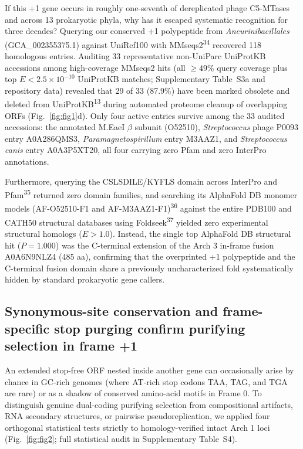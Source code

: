 \documentclass[10pt,letterpaper]{article}
\newcommand{\spname}[1]{\textit{#1}}
\newcommand{\refsup}[1]{\textsuperscript{#1}}
\begin{document}
If this +1 gene occurs in roughly one-seventh of dereplicated phage C5-MTases and across 13 prokaryotic phyla, why has it escaped systematic recognition for three decades? Querying our conserved +1 polypeptide from \spname{Aneurinibacillales} (GCA\_002355375.1) against UniRef100 with MMseqs2\refsup{34} recovered 118 homologous entries. Auditing 33 representative non-UniParc UniProtKB accessions among high-coverage MMseqs2 hits (all $\ge 49\%$ query coverage plus top $E < 2.5 \times 10^{-10}$ UniProtKB matches; Supplementary Table~S3a and repository data) revealed that 29 of 33 (87.9\%) have been marked obsolete and deleted from UniProtKB\refsup{13} during automated proteome cleanup of overlapping ORFs (Fig.~\ref{fig:fig1}d). Only four active entries survive among the 33 audited accessions: the annotated M.EaeI $\beta$ subunit (O52510), \spname{Streptococcus} phage P0093 entry A0A286QMS3, \spname{Paramagnetospirillum} entry M3AAZ1, and \spname{Streptococcus canis} entry A0A3P5XT20, all four carrying zero Pfam and zero InterPro annotations.

Furthermore, querying the CSLSDILE/KYFLS domain across InterPro and Pfam\refsup{35} returned zero domain families, and searching its AlphaFold DB monomer models (AF-O52510-F1 and AF-M3AAZ1-F1)\refsup{36} against the entire PDB100 and CATH50 structural databases using Foldseek\refsup{37} yielded zero experimental structural homologs ($E > 1.0$). Instead, the single top AlphaFold DB structural hit ($P = 1.000$) was the C-terminal extension of the Arch 3 in-frame fusion A0A6N9NLZ4 (485 aa), confirming that the overprinted +1 polypeptide and the C-terminal fusion domain share a previously uncharacterized fold systematically hidden by standard prokaryotic gene callers.

\subsection{Synonymous-site conservation and frame-specific stop purging confirm purifying selection in frame +1}

An extended stop-free ORF nested inside another gene can occasionally arise by chance in GC-rich genomes (where AT-rich stop codons TAA, TAG, and TGA are rare) or as a shadow of conserved amino-acid motifs in Frame 0. To distinguish genuine dual-coding purifying selection from compositional artifacts, RNA secondary structures, or pairwise pseudoreplication, we applied four orthogonal statistical tests strictly to homology-verified intact Arch 1 loci (Fig.~\ref{fig:fig2}; full statistical audit in Supplementary Table~S4).
\end{document}
